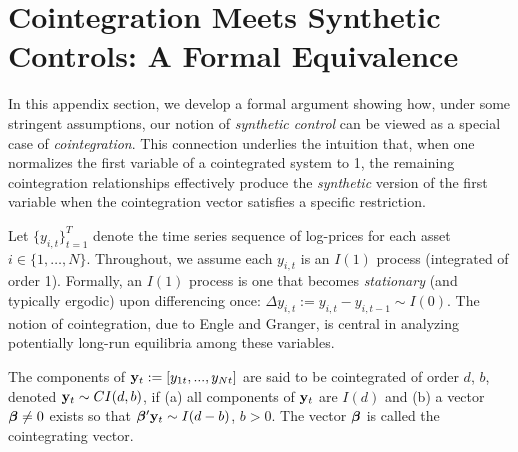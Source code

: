 \section{Cointegration Meets Synthetic Controls: A Formal Equivalence}
\label{sec:cointegration_synthetic_controls}

In this appendix section, we develop a formal argument showing how, under some stringent assumptions, our notion of \emph{synthetic control} can be viewed as a special case of \emph{cointegration}. This connection underlies the intuition that, when one normalizes the first variable of a cointegrated system to 1, the remaining cointegration relationships effectively produce the \emph{synthetic} version of the first variable when the cointegration vector satisfies a specific restriction. 


Let $\{y_{i,t} \}_{t=1}^{T}$ denote the time series sequence of log-prices for each asset $i\in\{1,\ldots,N\}$.
%
Throughout, we assume each $y_{i,t}$ is an $I(1)$ process (integrated of order 1). 
%
Formally, an $I(1)$ process is one that becomes \emph{stationary} (and typically ergodic) upon differencing once:
$\Delta y_{i,t} := y_{i,t} - y_{i,t-1} \sim I(0).$
%
The notion of cointegration, due to Engle and Granger, is central in analyzing potentially long-run equilibria among these variables.

\begin{definition}
The components of $\mathbf{y}_t:=[y_{1t}, ..., y_{Nt}]$ are said to be cointegrated of order $d$, $b$, denoted $\mathbf{y}_t \sim CI(d,b)$, if (a) all components of $\mathbf{y}_t$ are $I(d)$ and (b) a vector $\boldsymbol{\beta}\neq 0$ exists so that $\boldsymbol{\beta}'\mathbf{y}_t \sim I(d-b)$, $b > 0$. The vector $\boldsymbol{\beta}$ is called the cointegrating vector.
\end{definition}

